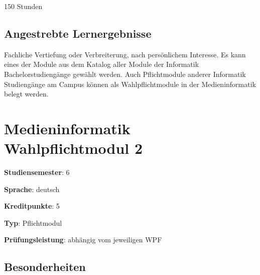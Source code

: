 150 Stunden

\hypertarget{angestrebte-lernergebnissepathlabel....srcmodulbeschreibungen-bachelor-bpo5ba_mi-wpf-1}{%
\section*{Angestrebte
Lernergebnisse\label{../../src/modulbeschreibungen-bachelor-bpo5/BA_MI-WPF-1}}\label{angestrebte-lernergebnissepathlabel....srcmodulbeschreibungen-bachelor-bpo5ba_mi-wpf-1}}

Fachliche Vertiefung oder Verbreiterung, nach persönlichem Interesse. Es
kann eines der Module aus dem Katalog aller Module der Informatik
Bachelorstudiengänge gewählt werden. Auch Pflichtmodule anderer
Informatik Studiengänge am Campus können als Wahlpflichtmodule in der
Medieninformatik belegt werden.

\hypertarget{medieninformatik-wahlpflichtmodul-2pathlabel....srcmodulbeschreibungen-bachelor-bpo5ba_mi-wpf-2}{%
\chapter{Medieninformatik Wahlpflichtmodul
2\label{../../src/modulbeschreibungen-bachelor-bpo5/BA_MI-WPF-2}}\label{medieninformatik-wahlpflichtmodul-2pathlabel....srcmodulbeschreibungen-bachelor-bpo5ba_mi-wpf-2}}

\begin{modulHead}
\textbf{Studiensemester}:
6
\end{modulHead}
\begin{modulHead}
\textbf{Sprache}:
deutsch
\end{modulHead}
\begin{modulHead}
\textbf{Kreditpunkte}:
5
\end{modulHead}
\begin{modulHead}
\textbf{Typ}:
Pflichtmodul
\end{modulHead}
\begin{modulHead}
\textbf{Prüfungsleistung}:
abhängig vom jeweiligen WPF
\end{modulHead}


\hypertarget{besonderheitenpathlabel....srcmodulbeschreibungen-bachelor-bpo5ba_mi-wpf-2}{%
\section*{Besonderheiten\label{../../src/modulbeschreibungen-bachelor-bpo5/BA_MI-WPF-2}}\label{besonderheitenpathlabel....srcmodulbeschreibungen-bachelor-bpo5ba_mi-wpf-2}}

